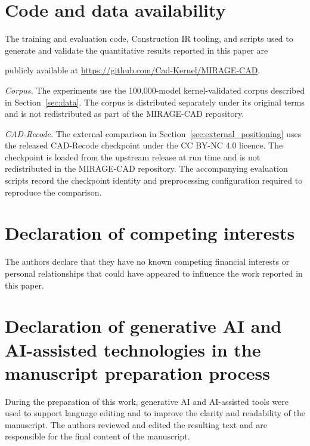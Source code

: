 \documentclass[preprint,12pt]{elsarticle}
\newif\ifanonymous
\newcommand{\repourl}{https://github.com/Cad-Kernel/MIRAGE-CAD}
\begin{document}
\section*{Code and data availability}
\label{sec:availability}

The training and evaluation code, Construction IR tooling, and scripts used
to generate and validate the quantitative results reported in this paper are
\ifanonymous
publicly available in a repository whose URL is withheld for anonymous review
and can be supplied to the editor on request.
\else
publicly available at \url{\repourl}.
\fi

\emph{Corpus.}
The experiments use the 100,000-model kernel-validated corpus described in
Section~\ref{sec:data}. The corpus is distributed separately under its
original terms and is not redistributed as part of the MIRAGE-CAD repository.

\emph{CAD-Recode.}
The external comparison in Section~\ref{sec:external_positioning} uses the
released CAD-Recode checkpoint under the CC BY-NC 4.0 licence. The checkpoint
is loaded from the upstream release at run time and is not redistributed in
the MIRAGE-CAD repository. The accompanying evaluation scripts record the
checkpoint identity and preprocessing configuration required to reproduce the
comparison.

\section*{Declaration of competing interests}

The authors declare that they have no known competing financial interests or
personal relationships that could have appeared to influence the work reported
in this paper.

\section*{Declaration of generative AI and AI-assisted technologies in the manuscript preparation process}

During the preparation of this work, generative AI and AI-assisted tools were
used to support language editing and to improve the clarity and readability of
the manuscript. The authors reviewed and edited the resulting text and are
responsible for the final content of the manuscript.

\appendix
{}
\renewcommand{\thetable}{\Alph{section}.\arabic{table}}
\renewcommand{\thefigure}{\Alph{section}.\arabic{figure}}
\end{document}
